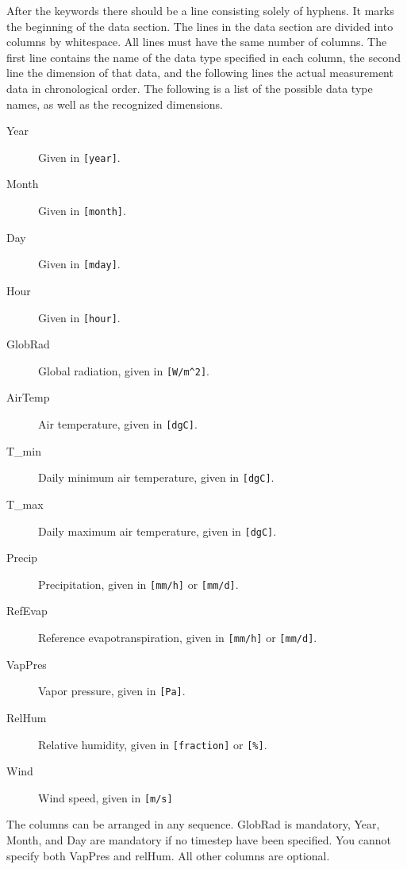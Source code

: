 After the keywords there should be a line consisting solely of
hyphens.  It marks the beginning of the data section.  The lines in
the data section are divided into columns by whitespace.  All lines
must have the same number of columns.  The first line contains the
name of the data type specified in each column, the second line the
dimension of that data, and the following lines the actual measurement
data in chronological order.  The following is a list of the possible
data type names, as well as the recognized dimensions.
\begin{description}
\item[Year] Given in \texttt{[year]}.
\item[Month] Given in \texttt{[month]}.
\item[Day] Given in \texttt{[mday]}.
\item[Hour] Given in \texttt{[hour]}.
\item[GlobRad] Global radiation, given in \verb|[W/m^2]|.
\item[AirTemp] Air temperature, given in \texttt{[dgC]}.
\item[T\_min] Daily minimum air temperature, given in \texttt{[dgC]}.
\item[T\_max] Daily maximum air temperature, given in \texttt{[dgC]}.
\item[Precip] Precipitation, given in \texttt{[mm/h]} or \texttt{[mm/d]}.
\item[RefEvap] Reference evapotranspiration, given in \texttt{[mm/h]}
  or \texttt{[mm/d]}.
\item[VapPres] Vapor pressure, given in \texttt{[Pa]}.
\item[RelHum] Relative humidity, given in \texttt{[fraction]} or
  \texttt{[\%]}. 
\item[Wind] Wind speed, given in \texttt{[m/s]}
\end{description}
The columns can be arranged in any sequence.  GlobRad is mandatory,
Year, Month, and Day are mandatory if no timestep have been
specified.  You cannot specify both VapPres and relHum.  All other
columns are optional. 


